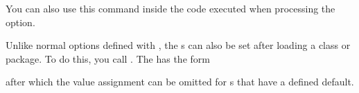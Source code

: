 You can also use this command inside the code executed when processing the
option.%
%
\EndIndexGroup


\begin{Declaration}
\end{Declaration}
Unlike normal options defined with , the s can
also be set after loading a class or package. To do this, you call
. The  has the form
after which the value assignment can be omitted for s that have a
defined default.

